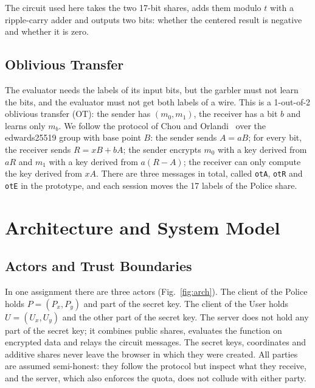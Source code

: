 \documentclass[conference,letterpaper]{IEEEtran}
\newcommand{\code}[1]{\texttt{\footnotesize #1}}
\begin{document}
The circuit used here takes the two 17-bit shares, adds them modulo $t$ with a ripple-carry adder and outputs two bits: whether the centered result is negative and whether it is zero.

\subsection{Oblivious Transfer}\label{sec:ot}
The evaluator needs the labels of its input bits, but the garbler must not learn the bits, and the evaluator must not get both labels of a wire. This is a 1-out-of-2 oblivious transfer (OT): the sender has $(m_0, m_1)$, the receiver has a bit $b$ and learns only $m_b$. We follow the protocol of Chou and Orlandi~\cite{chouorlandi} over the edwards25519 group with base point $B$: the sender sends $A = aB$; for every bit, the receiver sends $R = xB + bA$; the sender encrypts $m_0$ with a key derived from $aR$ and $m_1$ with a key derived from $a(R - A)$; the receiver can only compute the key derived from $xA$. There are three messages in total, called \code{otA}, \code{otR} and \code{otE} in the prototype, and each session moves the 17 labels of the Police share.

\section{Architecture and System Model}\label{sec:arch}
\subsection{Actors and Trust Boundaries}
In one assignment there are three actors (Fig.~\ref{fig:arch}). The client of the Police holds $P = (P_x, P_y)$ and part of the secret key. The client of the User holds $U = (U_x, U_y)$ and the other part of the secret key. The server does not hold any part of the secret key; it combines public shares, evaluates the function on encrypted data and relays the circuit messages. The secret keys, coordinates and additive shares never leave the browser in which they were created. All parties are assumed semi-honest: they follow the protocol but inspect what they receive, and the server, which also enforces the quota, does not collude with either party.
\end{document}

